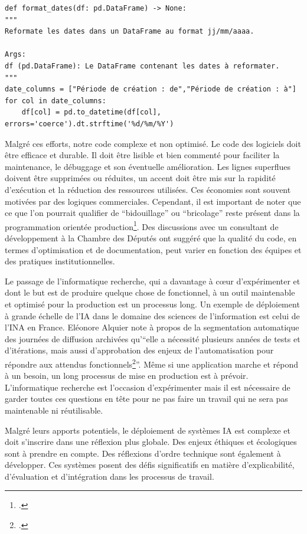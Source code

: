 \begin{lstlisting}
def format_dates(df: pd.DataFrame) -> None:
"""
Reformate les dates dans un DataFrame au format jj/mm/aaaa.

Args:
df (pd.DataFrame): Le DataFrame contenant les dates à reformater.
"""
date_columns = ["Période de création : de","Période de création : à"]
for col in date_columns:
	df[col] = pd.to_datetime(df[col], errors='coerce').dt.strftime('%d/%m/%Y')
\end{lstlisting}


Malgré ces efforts, notre code complexe et non optimisé. Le code des logiciels doit être efficace et durable. Il doit être lisible et bien commenté pour faciliter la maintenance, le débuggage et son éventuelle amélioration. Les lignes superflues doivent être supprimées ou réduites, un accent doit être mis sur la rapidité d'exécution et la réduction des ressources utilisées. Ces économies sont souvent motivées par des logiques commerciales. Cependant, il est important de noter que ce que l'on pourrait qualifier de \enquote{bidouillage} ou \enquote{bricolage} reste présent dans la programmation orientée production\footcite{depaz_role_2023}. Des discussions avec un consultant de développement à la Chambre des Députés ont suggéré que la qualité du code, en termes d'optimisation et de documentation, peut varier en fonction des équipes et des pratiques institutionnelles.

Le passage de l'informatique recherche, qui a davantage à cœur d'expérimenter et dont le but est de produire quelque chose de fonctionnel, à un outil maintenable et optimisé pour la production est un processus long. Un exemple de déploiement à grande échelle de l'IA dans le domaine des sciences de l'information est celui de l'INA en France. Eléonore Alquier note à propos de la segmentation automatique des journées de diffusion archivées
qu'\enquote{elle a nécessité plusieurs années de tests et d'itérations, mais aussi d'approbation des
	enjeux de l'automatisation pour répondre aux attendus fonctionnels\footcite{IA_INA}}.
Même si une application marche et répond à un besoin, un long processus de mise en production est à prévoir. 
L'informatique recherche est l'occasion d'expérimenter mais il est nécessaire de garder toutes ces questions en tête pour ne pas faire un travail
qui ne sera pas maintenable ni réutilisable.
\newline

Malgré leurs apports potentiels, le déploiement de systèmes IA est complexe et doit s'inscrire dans une réflexion plus globale.
Des enjeux éthiques et écologiques sont à prendre en compte. Des réflexions d'ordre technique sont également à développer.
Ces systèmes posent des défis significatifs en matière d'explicabilité, d'évaluation et d'intégration dans les processus de travail.









